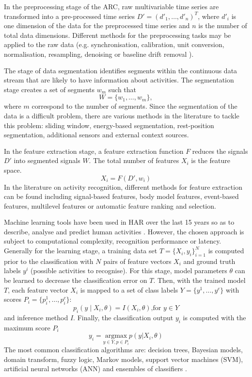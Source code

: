 \documentclass[10pt,journal,compsoc]{IEEEtran}
\begin{document}
In the preprocessing stage of the ARC, raw multivariable time series are transformed into a
pre-processed time series $D'= (d'_1, \dots, d'_n )^T$, where $d'_i$ is one dimension
of the data for the preprocessed time series and $n$ is the number of total data dimensions.
Different methods for the preprocessing tasks may be applied to the raw data
(e.g. synchronisation, calibration, unit conversion, normalisation, resampling, denoising
or baseline drift removal \cite{bulling2014}).

The stage of data segmentation identifies segments within the continuous data stream
that are likely to have information about activities. The segmentation stage creates
a set of segments $w_m$ %
such that
\begin{equation}
W = \{   w_1, \dots, w_m  \},
\end{equation}
where $m$ correspond to the number of segments.
Since the segmentation of the data is a difficult problem, there are various methods
in the literature to tackle this problem: sliding window, energy-based segmentation,
rest-position segmentation, additional sensors and external context sources.

In the feature extraction stage, a feature extraction function $F$ reduces
the signals $D'$  into segmented signals $W$.
The total number of features $X_i$ is the feature space.
\begin{equation}
X_i = F ( D', w_i)
\end{equation}
In the literature on activity recognition, different  methods for feature extraction
can be found including signal-based features, body model features, event-based features,
multilevel features or automatic feature ranking and selection.

Machine learning tools have been used in HAR over the last 15 years
so as to describe, analyse and predict human activities \cite{bulling2014}.
However, the chosen approach is subject to computational complexity,
recognition performance or latency.
Generally for the learning stage, a training data set $T = \{ X_i, y_i \}  ^N _ {i=1}$
is computed prior to the classification with $N$ pairs of feature vectors $X_i$ and ground
truth labels $y^i$ (possible activities to recognise). For this stage, model parameters
$\theta$ can be learned to decrease the classification error on $T$.
Then, with the trained model $T$, each feature vector $X_i$  is mapped to a set of class labels
$Y= \{ y^1, \dots , y^c \}$ with scores $P_i = \{ p^1_i, \dots, p^c_i \}$:
\begin{equation}
p_i ( y \mid X_i, \theta) = I (X_i, \theta) \mbox{,for } y \in Y
\end{equation}
and inference method $I$.
Finally, the classification output $y_i$ is computed with the maximum score $P_i$
\begin{equation}
y_i  =
\underset{ y \in Y, p \in P_i }{\text{argmax}}   p(y | X_i, \theta)
\end{equation}
The most common classification algorithms are: decision trees, Bayesian models,
domain transform, fuzzy logic, Markov models, support vector machines (SVM),
artificial neural networks (ANN) and ensembles of classifiers \cite{Lara2013}.
\end{document}
